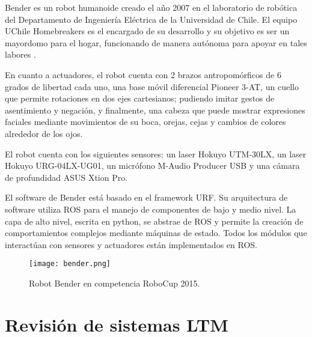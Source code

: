 Bender es un robot humanoide creado el año 2007 en el laboratorio de robótica del Departamento de Ingeniería Eléctrica de la Universidad de Chile. El equipo UChile Homebreakers es el encargado de su desarrollo y  su objetivo es ser un mayordomo para el hogar, funcionando de manera autónoma para apoyar en tales labores \cite{uchile-robotics}.



En cuanto a actuadores, el robot cuenta con 2 brazos antropomórficos de 6 grados de libertad cada uno, una base móvil diferencial Pioneer 3-AT, un cuello que permite rotaciones en dos ejes cartesianos; pudiendo imitar gestos de asentimiento y negación, y finalmente, una cabeza que puede mostrar expresiones faciales mediante movimientos de su boca, orejas, cejas y cambios de colores alrededor de los ojos.

El robot cuenta con los siguientes sensores: un laser Hokuyo UTM-30LX, un laser Hokuyo URG-04LX-UG01, un micrófono M-Audio Producer USB y una cámara de profundidad ASUS Xtion Pro.

El software de Bender está basado en el framework URF. Su arquitectura de software utiliza  ROS para el manejo de componentes de bajo y medio nivel. La capa de alto nivel, escrita en python, se abstrae de ROS y permite la creación de comportamientos complejos mediante máquinas de estado. Todos los módulos que interactúan con sensores y actuadores están implementados en ROS.


\begin{figure}[H]
	\centering
	\texttt{[image: bender.png]}
	\caption{\small Robot Bender en competencia RoboCup 2015.}
	\label{img:bender}
\end{figure}



%




\section{Revisión de sistemas LTM}

